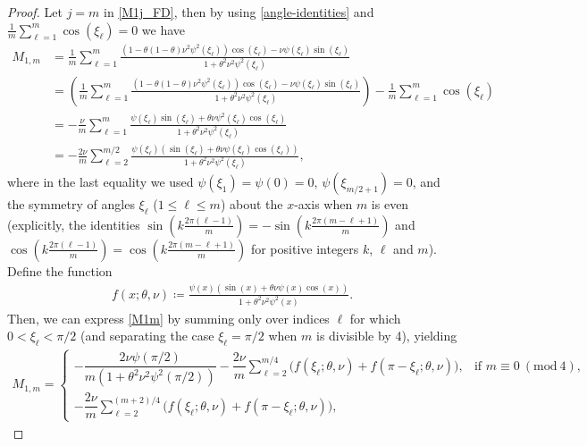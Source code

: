 \documentclass[a4paper]{article}
\newcommand{\Mod}[1]{\ (\mathrm{mod}\ #1)}
\begin{document}
\begin{description}[style=unboxed,leftmargin=0cm]
\begin{proof}
	Let $j = m$ in \eqref{M1j_FD}, then by using \eqref{angle-identities} and
	$\frac{1}{m}\sum_{\ell=1}^m \cos(\xi_\ell) = 0$ we have
	\begin{align}\label{M1m}
		M_{1,m} &= \frac{1}{m} \sum_{\ell=1}^{m} \frac{\left(1-\theta(1-\theta)\nu^2\psi^2(\xi_\ell)
					\right)\cos(\xi_\ell)-\nu\psi(\xi_\ell)\sin(\xi_\ell)}{1+\theta^2\nu^2\psi^2(\xi_\ell)} \nonumber \\
					&= \left(\frac{1}{m} \sum_{\ell=1}^{m} \frac{\left(1-\theta(1-\theta)\nu^2\psi^2(\xi_\ell)\right)
					\cos(\xi_\ell) - \nu\psi(\xi_\ell)\sin(\xi_\ell)}{1+\theta^2\nu^2\psi^2(\xi_\ell)}\right) -
					\frac{1}{m}\sum_{\ell=1}^m \cos(\xi_\ell) \nonumber \\
					&= -\frac{\nu}{m} \sum_{\ell=1}^{m} \frac{\psi(\xi_\ell)\sin(\xi_\ell)+\theta\nu\psi^2(\xi_\ell)
					\cos(\xi_\ell) }{1+\theta^2\nu^2\psi^2(\xi_\ell)} \nonumber \\
					&= -\frac{2\nu}{m} \sum_{\ell=2}^{m/2} \frac{\psi(\xi_\ell)(\sin(\xi_\ell)+\theta\nu\psi(\xi_\ell)
					\cos(\xi_\ell))}{1+\theta^2\nu^2\psi^2(\xi_\ell)},
	\end{align}
	where in the last equality we used $\psi(\xi_1) = \psi(0) = 0$,  $\psi(\xi_{m/2+1}) =  0$, and the symmetry
	of angles $\xi_\ell$ ($1 \le \ell \le m$) about the $x$-axis when $m$ is even (explicitly, the identities
	$\sin\left(k\frac{2\pi(\ell-1)}{m}\right)=-\sin\left(k\frac{2\pi(m-\ell+1)}{m}\right)$ and
	$\cos\left(k\frac{2\pi(\ell-1)}{m}\right)=\cos\left(k\frac{2\pi(m-\ell+1)}{m}\right)$ for positive integers
	$k$, $\ell$ and $m$).
	Define the function 
	\begin{align*}
		f(x; \theta, \nu) \coloneqq \frac{\psi(x)(\sin(x)+\theta\nu\psi(x)\cos(x))}{1+\theta^2\nu^2\psi^2(x)}.
	\end{align*}
	Then, we can express \eqref{M1m} by summing only over indices $\ell$ for which $0 < \xi_\ell  < \pi/2$ (and separating the case $\xi_\ell  = \pi/2$ when $m$ is divisible by 4),
	yielding
	\ifjournal
		\begin{align}\label{M1mnew}
			M_{1,m} = \begin{cases}
								-\dfrac{2\nu\psi(\pi/2)}{m\left(1+\theta^2\nu^2\psi^2(\pi/2)\right)} -
									\dfrac{2\nu}{m} \displaystyle{\sum\limits_{\ell=2}^{m/4}}
									\Big(f(\xi_\ell; \theta, \nu) + f(\pi-\xi_\ell; \theta, \nu) \Big),
									& \text{if } m \equiv 0 \Mod{4}, \\[20pt]
								-\dfrac{2\nu}{m} \displaystyle{\sum\limits_{\ell=2}^{(m+2)/4}}
									\Big(f(\xi_\ell; \theta, \nu) + f(\pi-\xi_\ell; \theta, \nu)\Big),

\end{cases}
\end{align}
\end{proof}
\end{description}
\end{document}
